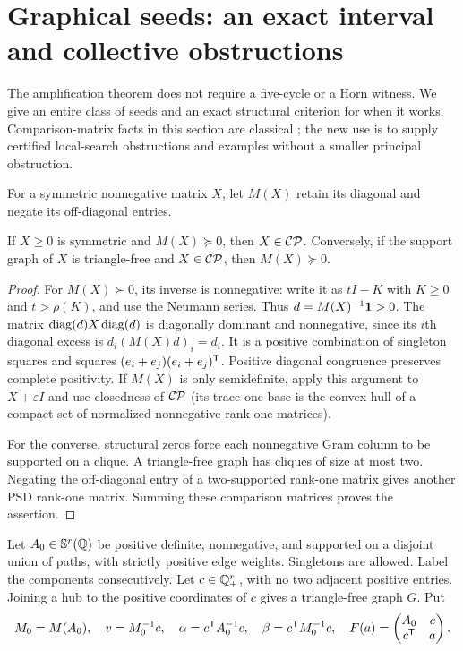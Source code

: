 \section{Graphical seeds: an exact interval and collective obstructions}
The amplification theorem does not require a five-cycle or a Horn witness. We give an entire class of seeds and an exact structural criterion for when it works. Comparison-matrix facts in this section are classical \cite{Drew,Kogan}; the new use is to supply certified local-search obstructions and examples without a smaller principal obstruction.

For a symmetric nonnegative matrix $X$, let $M(X)$ retain its diagonal and negate its off-diagonal entries.

\begin{lemma}\label{lem:comparison}
If $X\ge0$ is symmetric and $M(X)\succeq0$, then $X\in\mathcal{CP}$. Conversely, if the support graph of $X$ is triangle-free and $X\in\mathcal{CP}$, then $M(X)\succeq0$.
\end{lemma}
\begin{proof}
For $M(X)\succ0$, its inverse is nonnegative: write it as $tI-K$ with $K\ge0$ and $t>\rho(K)$, and use the Neumann series. Thus $d=M(X)^{-1}{\bf1}>0$. The matrix $\operatorname{diag}(d)X\operatorname{diag}(d)$ is diagonally dominant and nonnegative, since its $i$th diagonal excess is $d_i(M(X)d)_i=d_i$. It is a positive combination of singleton squares and squares $(e_i+e_j)(e_i+e_j)^{\mathsf T}$. Positive diagonal congruence preserves complete positivity. If $M(X)$ is only semidefinite, apply this argument to $X+\varepsilon I$ and use closedness of $\mathcal{CP}$ (its trace-one base is the convex hull of a compact set of normalized nonnegative rank-one matrices).

For the converse, structural zeros force each nonnegative Gram column to be supported on a clique. A triangle-free graph has cliques of size at most two. Negating the off-diagonal entry of a two-supported rank-one matrix gives another PSD rank-one matrix. Summing these comparison matrices proves the assertion.
\end{proof}

Let $A_0\in\mathbb S^r(\mathbb Q)$ be positive definite, nonnegative, and supported on a disjoint union of paths, with strictly positive edge weights. Singletons are allowed. Label the components consecutively. Let $c\in\mathbb Q_+^r$, with no two adjacent positive entries. Joining a hub to the positive coordinates of $c$ gives a triangle-free graph $G$. Put
\[
 M_0=M(A_0),\quad v=M_0^{-1}c,\quad
 \alpha=c^{\mathsf T} A_0^{-1}c,\quad\beta=c^{\mathsf T} M_0^{-1}c,\quad
 F(a)=\begin{pmatrix}A_0&c\\c^{\mathsf T}&a\end{pmatrix}.
\]

